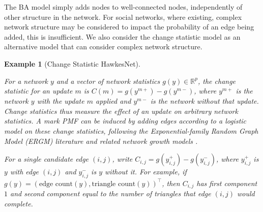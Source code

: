 \documentclass[12pt]{article}
\newtheorem{example}{Example}
\begin{document}
The BA model simply adds nodes to well-connected nodes, independently of other structure in the network. For social networks, where existing, complex network structure may be considered to impact the probability of an edge being added, this is insufficient. We also consider the change statistic model as an alternative model that can consider complex network structure.

\begin{example}[Change Statistic HawkesNet]\label{ex:cs}

For a network $y$ and a vector of network statistics $g(y) \in \mathbb{R}^{p}$, the change statistic for an update $m$ is $C(m) = g(y^{m+}) - g(y^{m-})$, where $y^{m+}$ is the network $y$ with the update $m$ applied and $y^{m-}$ is the network without that update. Change statistics thus measure the effect of an update on arbitrary network statistics. A mark PMF can be induced by adding edges according to a logistic model on these change statistics, following the Exponential-family Random Graph Model (ERGM) literature \citep{FrankStrauss1986,snijders2006,Robins2007} and related network growth models \citep{Fellows2018}.

For a single candidate edge $(i,j)$, write $C_{i,j} = g(y_{i,j}^{+}) - g(y_{i,j}^{-})$, where $y_{i,j}^{+}$ is $y$ with edge $(i,j)$ and $y_{i,j}^{-}$ is $y$ without it. For example, if $g(y) = (\text{edge count}(y), \text{triangle count}(y))^{\top}$, then $C_{i,j}$ has first component $1$ and second component equal to the number of triangles that edge $(i,j)$ would complete.


\end{example}
\end{document}
